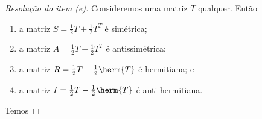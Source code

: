 \begin{proof}[Resolução do item (e)]
    Consideremos uma matriz \(T\) qualquer. Então
    \begin{enumerate}[label=(\alph*)]
        \item a matriz \(S = \frac12 T + \frac12T^T\) é simétrica;
        \item a matriz \(A = \frac12T - \frac12T^T\) é antissimétrica;
        \item a matriz \(R = \frac12T + \frac12\herm{T}\) é hermitiana; e
        \item a matriz \(I = \frac12T - \frac12\herm{T}\) é anti-hermitiana.
    \end{enumerate}
    Temos
\end{proof}
